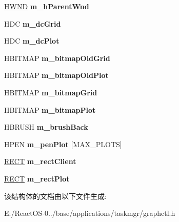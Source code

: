 \begin{DoxyCompactItemize}
\mbox{\label{struct_t_graph_ctrl_ad6a168771573601d62bd7d072ea055c3}} 
\hyperlink{interfacevoid}{H\+W\+ND} {\bfseries m\+\_\+h\+Parent\+Wnd}
\item 
\mbox{\label{struct_t_graph_ctrl_a3a86855374874405d6fa403f1fe66de1}} 
H\+DC {\bfseries m\+\_\+dc\+Grid}
\item 
\mbox{\label{struct_t_graph_ctrl_ac1087d19a46ba5a216ecafb1df431836}} 
H\+DC {\bfseries m\+\_\+dc\+Plot}
\item 
\mbox{\label{struct_t_graph_ctrl_a92f2cfb5abb96d66bf8a060a3ef64583}} 
H\+B\+I\+T\+M\+AP {\bfseries m\+\_\+bitmap\+Old\+Grid}
\item 
\mbox{\label{struct_t_graph_ctrl_a7d07a450e2294a00da62c3a3092c7dc2}} 
H\+B\+I\+T\+M\+AP {\bfseries m\+\_\+bitmap\+Old\+Plot}
\item 
\mbox{\label{struct_t_graph_ctrl_ac19ecf99eb1a8755bad5b2c36a7d7248}} 
H\+B\+I\+T\+M\+AP {\bfseries m\+\_\+bitmap\+Grid}
\item 
\mbox{\label{struct_t_graph_ctrl_a490eb2ea920ba5d20d757d0298b5de41}} 
H\+B\+I\+T\+M\+AP {\bfseries m\+\_\+bitmap\+Plot}
\item 
\mbox{\label{struct_t_graph_ctrl_a7b96e88be9d986e2548dea94fd04b86c}} 
H\+B\+R\+U\+SH {\bfseries m\+\_\+brush\+Back}
\item 
\mbox{\label{struct_t_graph_ctrl_a693d11c0aceb0a029a850515df000096}} 
H\+P\+EN {\bfseries m\+\_\+pen\+Plot} \mbox{[}M\+A\+X\+\_\+\+P\+L\+O\+TS\mbox{]}
\item 
\mbox{\label{struct_t_graph_ctrl_a9fee6b839662259bb61179ed24dce754}} 
\hyperlink{structtag_r_e_c_t}{R\+E\+CT} {\bfseries m\+\_\+rect\+Client}
\item 
\mbox{\label{struct_t_graph_ctrl_a6c475515f36501d21ea8e8ab950fa7e3}} 
\hyperlink{structtag_r_e_c_t}{R\+E\+CT} {\bfseries m\+\_\+rect\+Plot}
\end{DoxyCompactItemize}


该结构体的文档由以下文件生成\+:\begin{DoxyCompactItemize}
\item 
E\+:/\+React\+O\+S-\/0../base/applications/taskmgr/graphctl.\+h\end{DoxyCompactItemize}
